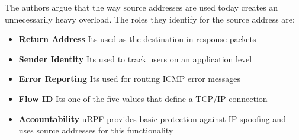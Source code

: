 \documentclass{acm_proc_article-sp}
\begin{document}
The authors argue that the way source addresses are used today creates an unnecessarily heavy overload. The roles they identify for the source address are:

\begin{itemize}
\item \textbf{Return Address} Its used as the destination in response packets
\item \textbf{Sender Identity} Its used to track users on an application level
\item \textbf{Error Reporting} Its used for routing ICMP error messages
\item \textbf{Flow ID} Its one of the five values that define a TCP/IP connection 
\item \textbf{Accountability} uRPF provides basic protection against IP spoofing and uses source addresses for this functionality
\end{itemize}

\end{document}
